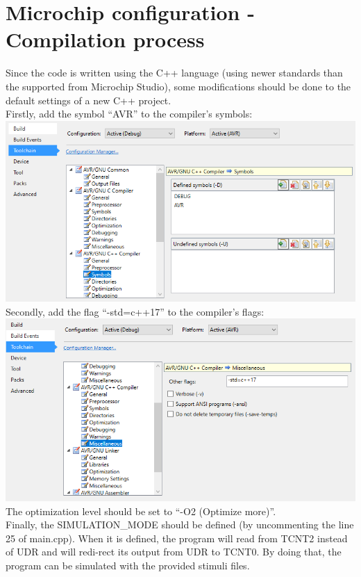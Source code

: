 \documentclass[12pt, a4]{article}
\begin{document}
\section*{Microchip configuration - Compilation process}
Since the code is written using the C++ language (using newer standards than the supported from Microchip Studio), some modifications should be done to the default settings of a new C++ project.  \\
Firstly, add the symbol “AVR” to the compiler’s symbols:\\
\includegraphics[scale=0.75]{CPP_AVR_SYMBOL.png} \\
Secondly, add the flag “-std=c++17” to the compiler’s flags:\\
\includegraphics[scale=0.75]{CPP_STD_17.png}  \\
The optimization level should be set to “-O2 (Optimize more)''.\\
Finally, the SIMULATION\_MODE should be defined (by uncommenting the line 25 of main.cpp). When it is defined, the program will read from TCNT2 instead of UDR and will redi-rect its output from UDR to TCNT0. By doing that, the program can be simulated with the provided stimuli files.
\end{document}

